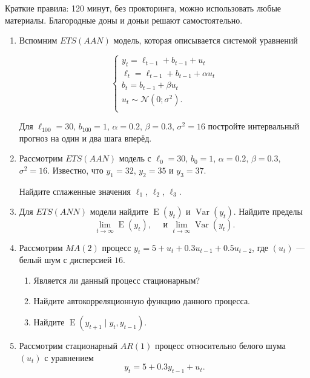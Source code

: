 \documentclass[12pt]{article}
\DeclareMathOperator{\Var}{Var}
\DeclareMathOperator{\E}{E}
\def \cN{\mathcal{N}}
\begin{document}
Краткие правила: 120 минут, без прокторинга, можно использовать любые материалы. 
Благородные доны и доньи решают самостоятельно. 

\begin{enumerate}

\item Вспомним $ETS(AAN)$ модель, которая описывается системой уравнений

	\[
	\begin{cases}
	y_t = \ell_{t-1} + b_{t-1} + u_t \\
	\ell_t = \ell_{t-1} + b_{t-1} + \alpha u_t \\
	b_t = b_{t-1} + \beta u_t \\
	u_t \sim \cN(0;\sigma^2). \\
	\end{cases}
	\]
	
		
Для $\ell_{100} = 30$, $b_{100} = 1$, $\alpha=0.2$, $\beta=0.3$, $\sigma^2 = 16$ постройте
		интервальный прогноз на один и два шага вперёд. 
	

\item Рассмотрим $ETS(AAN)$ модель с $\ell_{0} = 30$, $b_{0} = 1$, $\alpha=0.2$, $\beta=0.3$, $\sigma^2 = 16$.
Известно, что $y_1 = 32$, $y_2 = 35$ и $y_3 = 37$. 

Найдите сглаженные значения $\ell_1$, $\ell_2$, $\ell_3$. 
	


\item Для $ETS(ANN)$ модели найдите $\E(y_t)$ и $\Var(y_t)$. 
Найдите пределы
$$
\lim_{t\to \infty} \E(y_t), \quad \text{ и } \lim_{t\to \infty} \Var(y_t).
$$

\item Рассмотрим $MA(2)$ процесс $y_t = 5 + u_t + 0.3 u_{t-1} + 0.5 u_{t-2}$, где $(u_t)$ — белый шум с дисперсией $16$.

\begin{enumerate}
	\item Является ли данный процесс стационарным?
	\item Найдите автокорреляционную функцию данного процесса. 
	\item Найдите $\E(y_{t+1} \mid y_{t}, y_{t-1})$.
\end{enumerate}

\item Рассмотрим стационарный $AR(1)$ процесс относительно белого шума $(u_t)$ с уравнением 
\[
y_t = 5 + 0.3 y_{t-1} + u_t.
\]


\end{enumerate}
\end{document}
